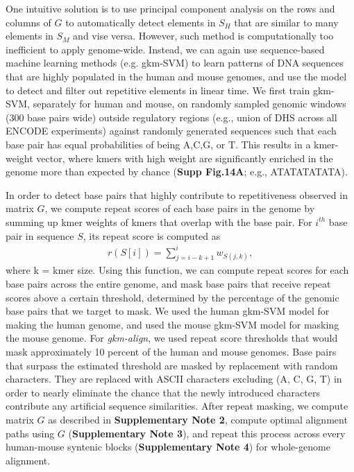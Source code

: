 \documentclass[english]{article}
\begin{document}
One intuitive solution is to use principal component analysis on the rows and columns of $G$ to automatically detect elements in $S_H$ that are similar to many elements in $S_M$ and vise versa. However, such method is computationally too inefficient to apply genome-wide. Instead, we can again use sequence-based machine learning methods (e.g. gkm-SVM) to learn patterns of DNA sequences that are highly populated in the human and mouse genomes, and use the model to detect and filter out repetitive elements in linear time.
We first train gkm-SVM, separately for human and mouse, on randomly sampled genomic windows (300 base pairs wide) outside regulatory regions (e.g., union of DHS across all ENCODE experiments) against randomly generated sequences such that each base pair has equal probabilities of being A,C,G, or T. This results in a kmer-weight vector, where kmers with high weight are significantly enriched in the genome more than expected by chance (\textbf{Supp Fig.14A}; e.g., ATATATATATA).

In order to detect base pairs that highly contribute to repetitiveness observed in matrix $G$,  we compute repeat scores of each base pairs in the genome by summing up kmer weights of kmers that overlap with the base pair. For $i^{th}$ base pair in sequence $S$, its repeat score is computed as 
\begin{align*}
    r(S[i]) = \sum_{j=i-k+1}^{i} w_{S(j,k)},
\end{align*}
where k = kmer size. Using this function, we can compute repeat scores for each base pairs across the entire genome, and mask base pairs that receive repeat scores above a certain threshold, determined by the percentage of the genomic base pairs that we target to mask. We used the human gkm-SVM model for making the human genome, and used the mouse gkm-SVM model for masking the mouse genome. For \textit{gkm-align}, we used repeat score thresholds that would mask approximately 10 percent of the human and mouse genomes. Base pairs that surpass the estimated threshold are masked by replacement with random characters. They are replaced with ASCII characters excluding (A, C, G, T) in order to nearly eliminate the chance that the newly introduced characters contribute any artificial sequence similarities. After repeat masking, we compute matrix $G$ as described in \textbf{Supplementary Note 2}, compute optimal alignment paths using $G$ (\textbf{Supplementary Note 3}), and repeat this process across every human-mouse syntenic blocks (\textbf{Supplementary Note 4}) for whole-genome alignment.
\end{document}
